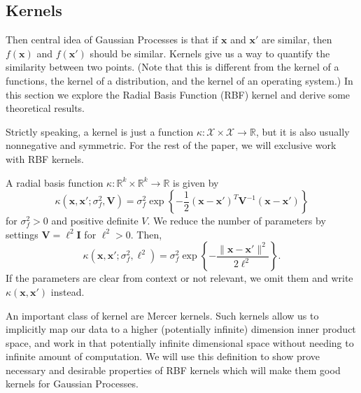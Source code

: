 \subsection{Kernels}

Then central idea of Gaussian Processes is that if $\mathbf{x}$ and $\mathbf{x}'$ are similar,
then $f(\mathbf{x})$ and $f(\mathbf{x}')$ should be similar.
Kernels give us a way to quantify the similarity between two points.
(Note that this is different from the kernel of a functions, the kernel of a distribution, and the kernel of an operating system.)
In this section we explore the Radial Basis Function (RBF) kernel and derive some theoretical results.

Strictly speaking, a kernel is just a function $\kappa: \mathcal{X} \times \mathcal{X} \to \mathbb{R}$,
but it is also usually nonnegative and symmetric.
For the rest of the paper, we will exclusive work with RBF kernels.

\begin{definition}
    A radial basis function $\kappa: \mathbb{R}^{k} \times \mathbb{R}^{k} \to \mathbb{R}$
    is given by
    \begin{equation*}
        \kappa(\mathbf{x}, \mathbf{x}'; \sigma_f^2, \mathbf{V})
        = \sigma_f^{2} \exp \left\{ -\frac12 (\mathbf{x} - \mathbf{x}')^{T} \mathbf{V}^{-1} (\mathbf{x} - \mathbf{x}') \right\}
    \end{equation*}
    for $\sigma_f^2 > 0$ and positive definite $V$.
    We reduce the number of parameters by settings $\mathbf{V} = \ell^2\mathbf{I}$ for $\ell^2 > 0$.
    Then,
    \begin{equation*}
        \kappa(\mathbf{x}, \mathbf{x}'; \sigma_f^2, \ell^2)
        = \sigma_f^{2} \exp \left\{ - \frac{ \lVert \mathbf{x} - \mathbf{x}' \rVert^2 }{ 2 \ell^2 }\right\}.
    \end{equation*}
    If the parameters are clear from context or not relevant, we omit them and write $\kappa(\mathbf{x}, \mathbf{x}')$ instead.
\end{definition}

An important class of kernel are Mercer kernels.
Such kernels allow us to implicitly map our data to a higher (potentially infinite) dimension inner product space, and work in that potentially infinite dimensional space without needing to infinite amount of computation.
We will use this definition to show prove necessary and desirable properties of RBF kernels which will make them good kernels for Gaussian Processes.

